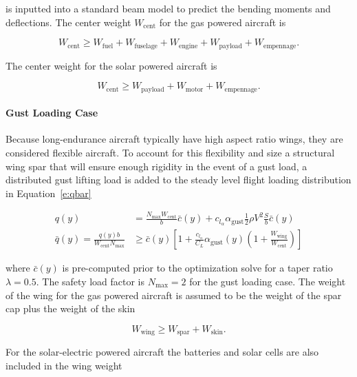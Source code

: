 is inputted into a standard beam model to predict the bending moments and deflections. The center weight $W_{\text{cent}}$ for the gas powered aircraft is

\begin{equation}
    W_{\text{cent}} \geq W_{\text{fuel}} + W_{\text{fuselage}} + W_{\text{engine}} + W_{\text{payload}} + W_{\text{empennage}}.
\end{equation}

The center weight for the solar powered aircraft is

\begin{equation}
    W_{\text{cent}} \geq W_{\text{payload}} + W_{\text{motor}} + W_{\text{empennage}}.
\end{equation}


\paragraph{\textbf{Gust Loading Case}} 

Because long-endurance aircraft typically have high aspect ratio wings, they are considered flexible aircraft. 
To account for this flexibility and size a structural wing spar that will ensure enough rigidity in the event of a gust load, a distributed gust lifting load is added to the steady level flight loading distribution in Equation~\eqref{e:qbar}

\begin{align}
    q(y) &= \frac{N_{\text{max}}W_{\text{cent}}}{b}\bar{c}(y) + c_{l_{\alpha}} \alpha_{\text{gust}} \frac{1}{2} \rho V^2 \frac{S}{b}\bar{c}(y) \\
    \bar{q}(y) = \frac{q(y)b}{W_{\text{cent}}N_{\text{max}}} &\geq \bar{c}(y) \left[1 + \frac{c_{l_{\alpha}}}{C_L} \alpha_{\text{gust}} (y) \left(1 + \frac{W_{\text{wing}}}{W_{\text{cent}}} \right) \right]
\end{align}

where $\bar{c}(y)$ is pre-computed prior to the optimization solve for a taper ratio $\lambda = 0.5$. The safety load factor is $N_{\text{max}}=2$ for the gust loading case. The weight of the wing for the gas powered aircraft is assumed to be the weight of the spar cap plus the weight of the skin 

\begin{equation}
    W_{\text{wing}} \geq W_{\text{spar}} + W_{\text{skin}}.
\end{equation}

For the solar-electric powered aircraft the batteries and solar cells are also included in the wing weight

